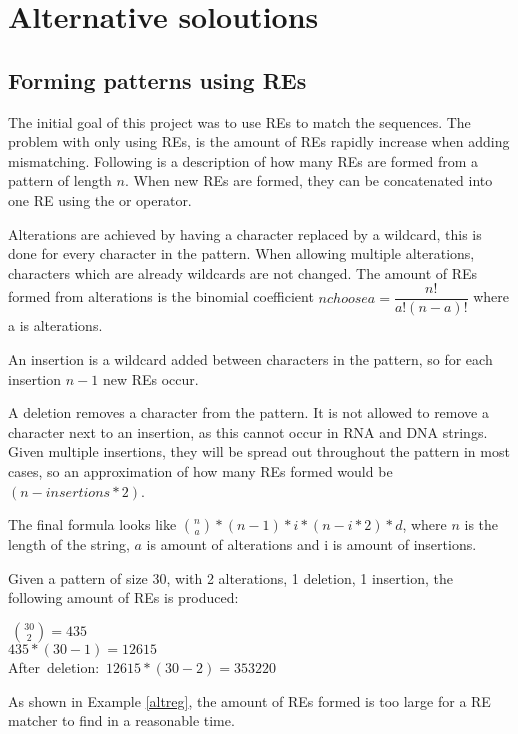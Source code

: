 \section{Alternative soloutions}
\subsection{Forming patterns using REs}
The initial goal of this project was to use REs to match the sequences. The problem with only using REs, is the amount of REs rapidly increase when adding mismatching. Following is a description of how many REs are formed from a pattern of length $n$. When new REs are formed, they can be concatenated into one RE using the or operator.

Alterations are achieved by having a character replaced by a wildcard, this is done for every character in the pattern. When allowing multiple alterations, characters which are already wildcards are not changed. The amount of REs formed from alterations is the binomial coefficient ${n choose a}=\dfrac{n!}{a!(n-a)!}$ where a is alterations.

An insertion is a wildcard added between characters in the pattern, so for each insertion $n-1$ new REs occur. 

A deletion removes a character from the pattern. It is not allowed to remove a character next to an insertion, as this cannot occur in RNA and DNA strings. Given multiple insertions, they will be spread out throughout the pattern in most cases, so an approximation of how many REs formed would be $(n - insertions * 2)$.

The final formula looks like ${n \choose a}*(n-1)*i*(n-i*2)*d$, where $n$ is the length of the string, $a$ is amount of alterations and i is amount of insertions.

\begin{myex}\label{altreg}
Given a pattern of size 30, with 2 alterations, 1 deletion, 1 insertion, the following amount of REs is produced: \\
\begin{center}
 $~{30 \choose 2} = 435$\\
 $435 * (30-1) = 12615$\\
After~deletion:~$12615*(30-2) = 353220$
\end{center}
\end{myex}

As shown in Example \ref{altreg}, the amount of REs formed is too large for a RE matcher to find in a reasonable time. 


